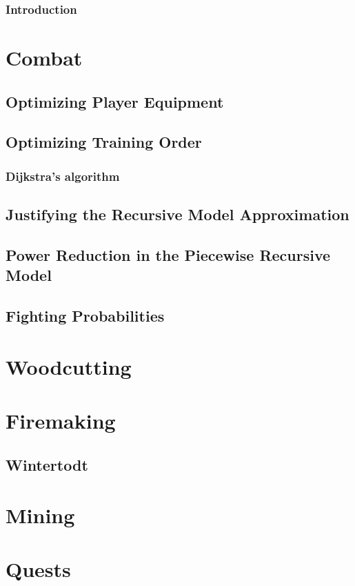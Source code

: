 \documentclass[10pt,a4paper]{report}
\begin{document}
	
	\tableofcontents
	\newpage

	\section*{Introduction}
		
	
	\part{Combat}
		
		
		
		
		
		\chapter{Optimizing Player Equipment}
			
		\chapter{Optimizing Training Order}
			\section{Dijkstra's algorithm}
		
		\begin{appendices}
			\chapter{Justifying the Recursive Model Approximation}\label{app:analytic_form_attempt}
				
			\chapter{Power Reduction in the Piecewise Recursive Model}
				
			\chapter{Fighting Probabilities}
				
		\end{appendices}

	\part{Woodcutting}
	\part{Firemaking}
		\chapter{Wintertodt}
			
	\part{Mining}
	\part{Quests}



\end{document}
